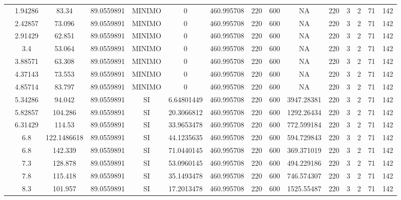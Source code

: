 \begin{table}[H]
{\begin{tabular}{|c|c|c|c|c|c|c|c|c|c|c|c|c|c|c|}
\cline{2-15}    & 1.94286 & 83.34 & 89.0559891 & MINIMO & 0   & 460.995708 & 220 & 600 & NA  & 220 & 3   & 2   & 71  & 142 \bigstrut\\
\cline{2-15}    & 2.42857 & 73.096 & 89.0559891 & MINIMO & 0   & 460.995708 & 220 & 600 & NA  & 220 & 3   & 2   & 71  & 142 \bigstrut\\
\cline{2-15}    & 2.91429 & 62.851 & 89.0559891 & MINIMO & 0   & 460.995708 & 220 & 600 & NA  & 220 & 3   & 2   & 71  & 142 \bigstrut\\
\cline{2-15}    & 3.4 & 53.064 & 89.0559891 & MINIMO & 0   & 460.995708 & 220 & 600 & NA  & 220 & 3   & 2   & 71  & 142 \bigstrut\\
\cline{2-15}    & 3.88571 & 63.308 & 89.0559891 & MINIMO & 0   & 460.995708 & 220 & 600 & NA  & 220 & 3   & 2   & 71  & 142 \bigstrut\\
\cline{2-15}    & 4.37143 & 73.553 & 89.0559891 & MINIMO & 0   & 460.995708 & 220 & 600 & NA  & 220 & 3   & 2   & 71  & 142 \bigstrut\\
\cline{2-15}    & 4.85714 & 83.797 & 89.0559891 & MINIMO & 0   & 460.995708 & 220 & 600 & NA  & 220 & 3   & 2   & 71  & 142 \bigstrut\\
\cline{2-15}    & 5.34286 & 94.042 & 89.0559891 & SI  & 6.64801449 & 460.995708 & 220 & 600 & 3947.28381 & 220 & 3   & 2   & 71  & 142 \bigstrut\\
\cline{2-15}    & 5.82857 & 104.286 & 89.0559891 & SI  & 20.3066812 & 460.995708 & 220 & 600 & 1292.26434 & 220 & 3   & 2   & 71  & 142 \bigstrut\\
\cline{2-15}    & 6.31429 & 114.53 & 89.0559891 & SI  & 33.9653478 & 460.995708 & 220 & 600 & 772.599184 & 220 & 3   & 2   & 71  & 142 \bigstrut\\
\cline{2-15}    & 6.8 & 122.1486618 & 89.0559891 & SI  & 44.1235635 & 460.995708 & 220 & 600 & 594.729843 & 220 & 3   & 2   & 71  & 142 \bigstrut\\
\cline{2-15}    & 6.8 & 142.339 & 89.0559891 & SI  & 71.0440145 & 460.995708 & 220 & 600 & 369.371019 & 220 & 3   & 2   & 71  & 142 \bigstrut\\
\cline{2-15}    & 7.3 & 128.878 & 89.0559891 & SI  & 53.0960145 & 460.995708 & 220 & 600 & 494.229186 & 220 & 3   & 2   & 71  & 142 \bigstrut\\
\cline{2-15}    & 7.8 & 115.418 & 89.0559891 & SI  & 35.1493478 & 460.995708 & 220 & 600 & 746.574307 & 220 & 3   & 2   & 71  & 142 \bigstrut\\
\cline{2-15}    & 8.3 & 101.957 & 89.0559891 & SI  & 17.2013478 & 460.995708 & 220 & 600 & 1525.55487 & 220 & 3   & 2   & 71  & 142 \bigstrut\\

\end{tabular}}
\end{table}
